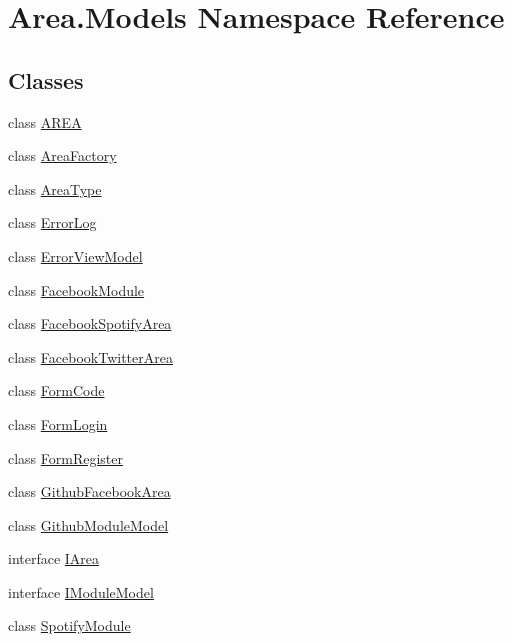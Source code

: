 \hypertarget{namespaceArea_1_1Models}{}\section{Area.\+Models Namespace Reference}
\label{namespaceArea_1_1Models}
\subsection*{Classes}
\begin{DoxyCompactItemize}
\item 
class \mbox{\hyperlink{classArea_1_1Models_1_1AREA}{A\+R\+EA}}
\item 
class \mbox{\hyperlink{classArea_1_1Models_1_1AreaFactory}{Area\+Factory}}
\item 
class \mbox{\hyperlink{classArea_1_1Models_1_1AreaType}{Area\+Type}}
\item 
class \mbox{\hyperlink{classArea_1_1Models_1_1ErrorLog}{Error\+Log}}
\item 
class \mbox{\hyperlink{classArea_1_1Models_1_1ErrorViewModel}{Error\+View\+Model}}
\item 
class \mbox{\hyperlink{classArea_1_1Models_1_1FacebookModule}{Facebook\+Module}}
\item 
class \mbox{\hyperlink{classArea_1_1Models_1_1FacebookSpotifyArea}{Facebook\+Spotify\+Area}}
\item 
class \mbox{\hyperlink{classArea_1_1Models_1_1FacebookTwitterArea}{Facebook\+Twitter\+Area}}
\item 
class \mbox{\hyperlink{classArea_1_1Models_1_1FormCode}{Form\+Code}}
\item 
class \mbox{\hyperlink{classArea_1_1Models_1_1FormLogin}{Form\+Login}}
\item 
class \mbox{\hyperlink{classArea_1_1Models_1_1FormRegister}{Form\+Register}}
\item 
class \mbox{\hyperlink{classArea_1_1Models_1_1GithubFacebookArea}{Github\+Facebook\+Area}}
\item 
class \mbox{\hyperlink{classArea_1_1Models_1_1GithubModuleModel}{Github\+Module\+Model}}
\item 
interface \mbox{\hyperlink{interfaceArea_1_1Models_1_1IArea}{I\+Area}}
\item 
interface \mbox{\hyperlink{interfaceArea_1_1Models_1_1IModuleModel}{I\+Module\+Model}}
\item 
class \mbox{\hyperlink{classArea_1_1Models_1_1SpotifyModule}{Spotify\+Module}}
\item 

\end{DoxyCompactItemize}
